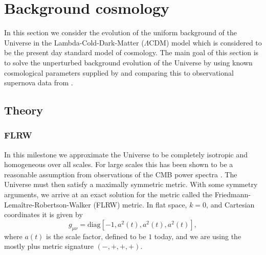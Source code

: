 \documentclass[%
reprint,
 amsmath,amssymb,
 aps,
]{revtex4-2}
\begin{document}
\section{Background cosmology}
\label{sec:1}
In this section we consider the evolution of the uniform background of the Universe in the Lambda-Cold-Dark-Matter ($\Lambda$CDM) model which is considered to be the present day standard model of cosmology. The main goal of this section is to solve the unperturbed background evolution of the Universe by using known cosmological parameters supplied by \cite{Planck:2018vyg} and comparing this to observational supernova data from \cite{SDSS:2014iwm}.

\subsection{Theory}
\subsubsection{FLRW}
In this milestone we approximate the Universe to be completely isotropic and homogeneous over all scales. For large scales this has been shown to be a reasonable assumption from observations of the CMB power spectra \cite{Dodelson:2003ft}. The Universe must then satisfy a maximally symmetric metric. With some symmetry arguments, we arrive at an exact solution for the metric called the Friedmann-Lema\^itre-Robertson-Walker (FLRW) metric. In flat space, $k=0$, and Cartesian coordinates it is given by
\[g_{\mu\nu}=\text{diag}\left[-1,a^2(t),a^2(t),a^2(t)\right],\]
where $a(t)$ is the scale factor, defined to be $1$ today, and we are using the mostly plus metric signature $(-,+,+,+)$. 
\end{document}
